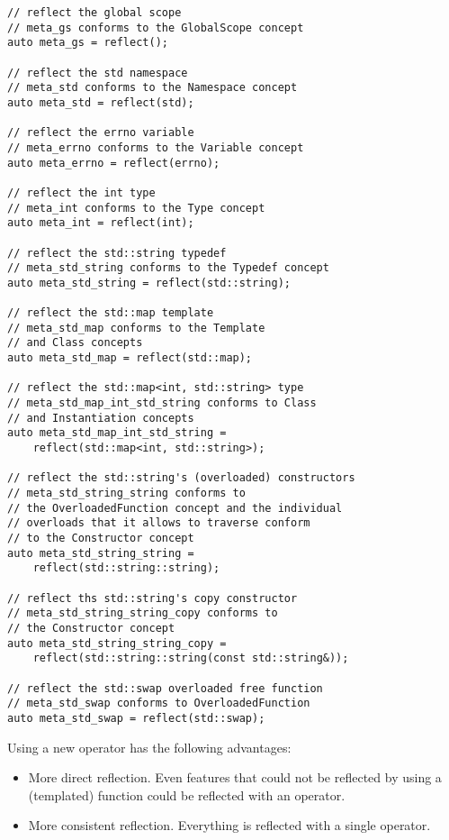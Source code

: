 \begin{lstlisting}
// reflect the global scope
// meta_gs conforms to the GlobalScope concept
auto meta_gs = reflect();

// reflect the std namespace
// meta_std conforms to the Namespace concept
auto meta_std = reflect(std);

// reflect the errno variable
// meta_errno conforms to the Variable concept
auto meta_errno = reflect(errno);

// reflect the int type
// meta_int conforms to the Type concept
auto meta_int = reflect(int);

// reflect the std::string typedef
// meta_std_string conforms to the Typedef concept
auto meta_std_string = reflect(std::string);

// reflect the std::map template
// meta_std_map conforms to the Template
// and Class concepts
auto meta_std_map = reflect(std::map);

// reflect the std::map<int, std::string> type
// meta_std_map_int_std_string conforms to Class
// and Instantiation concepts
auto meta_std_map_int_std_string = 
	reflect(std::map<int, std::string>);

// reflect the std::string's (overloaded) constructors
// meta_std_string_string conforms to
// the OverloadedFunction concept and the individual
// overloads that it allows to traverse conform
// to the Constructor concept
auto meta_std_string_string = 
	reflect(std::string::string);

// reflect ths std::string's copy constructor
// meta_std_string_string_copy conforms to
// the Constructor concept
auto meta_std_string_string_copy =
	reflect(std::string::string(const std::string&));

// reflect the std::swap overloaded free function
// meta_std_swap conforms to OverloadedFunction
auto meta_std_swap = reflect(std::swap);

\end{lstlisting}

Using a new operator has the following advantages:

\begin{itemize}
	\item More direct reflection. Even features that
	could not be reflected by using a (templated) function
	could be reflected with an operator.

	\item More consistent reflection. Everything is reflected
	with a single operator.
\end{itemize}

